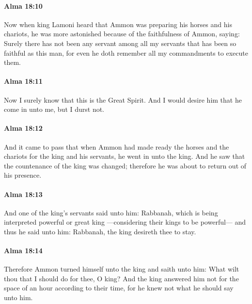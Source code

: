 		\paragraph{Alma 18:10} %
			\label{ALMA-18-10}

			Now when king Lamoni heard
			that Ammon was preparing his horses and his chariots,
			he was more astonished because of the faithfulness of Ammon, saying:
			Surely there has not been any servant among all my servants
			that has been so faithful as this man,
			for even he doth remember all my commandments to execute them.

		\paragraph{Alma 18:11} %
			\label{ALMA-18-11}

			Now I surely know that this is the Great Spirit.
			And I would desire him that he come in unto me,
			but I durst not.

		\paragraph{Alma 18:12} %
			\label{ALMA-18-12}

			And it came to pass that
			when Ammon had made ready the horses and the chariots
			for the king and his servants,
			he went in unto the king.
			And he saw that the countenance of the king was changed;
			therefore he was about to return out of his presence.

		\paragraph{Alma 18:13} %
			\label{ALMA-18-13}

			And one of the king's servants said unto him:
			Rabbanah, which is being interpreted powerful or great king
			---considering their kings to be powerful---
			and thus he said unto him:
			Rabbanah, the king desireth thee to stay.

		\paragraph{Alma 18:14} %
			\label{ALMA-18-14}

			Therefore Ammon turned himself unto the king and saith unto him:
			What wilt thou that I should do for thee, O king?
			And the king answered him not for the space of an hour according to their time,
			for he knew not what he should say unto him.

